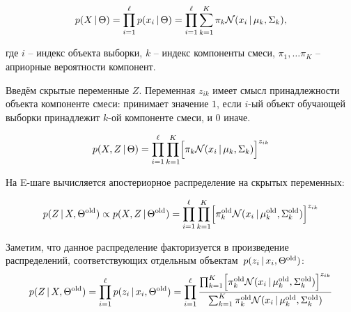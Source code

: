 \documentclass[12pt,a4paper]{article}
\begin{document}
\begin{equation*}
	p(X\mspace{3mu}{|}\mspace{3mu} \Theta) = \prod_{i=1}^\ell p(x_i\mspace{3mu}{|}\mspace{3mu} \Theta) = \prod_{i=1}^\ell \sum_{k=1}^K \pi_k \mathcal{N}(x_i \mspace{3mu}{|}\mspace{3mu} \mu_k, \Sigma_k),
\end{equation*}

где $i$ – индекс объекта выборки, $k$ – индекс компоненты смеси, $\pi_1, \ldots \pi_K$ – априорные вероятности компонент.

Введём скрытые переменные $Z$. Переменная $z_{ik}$ имеет смысл принадлежности объекта компоненте смеси: принимает значение $1$, если $i$-ый объект обучающей выборки принадлежит $k$-ой компоненте смеси, и $0$ иначе.

\begin{equation*}
p(X, Z \mspace{3mu}{|}\mspace{3mu} \Theta) = \prod_{i = 1}^{\ell}\prod_{k = 1}^{K} \Bigl[\pi_k \mathcal{N}(x_i \mspace{3mu}{|}\mspace{3mu} \mu_k, \Sigma_k) \Bigr]^{z_{ik}}
\end{equation*}

На E-шаге вычисляется апостериорное распределение на скрытых переменных:


\begin{equation*}
	p(Z\mspace{3mu}{|}\mspace{3mu} X,\Theta^{\text{old}}) \propto p(X, Z\mspace{3mu}{|}\mspace{3mu} \Theta^{\text{old}}) = \prod_{i = 1}^{\ell}\prod_{k = 1}^{K} \Bigl[\pi_k^{\text{old}} \mathcal{N}(x_i \mspace{3mu}{|}\mspace{3mu} \mu_k^{\text{old}}, \Sigma_k^{\text{old}}) \Bigr]^{z_{ik}}
\end{equation*}


Заметим, что данное распределение факторизуется в произведение распределений, соответствующих отдельным объектам~$p(z_i \mspace{3mu}{|}\mspace{3mu} x_i, \Theta^{\text{old}})$:
\begin{equation*}
p(Z \mspace{3mu}{|}\mspace{3mu} X, \Theta^{\text{old}}) = \prod_{i = 1}^{\ell}p(z_i \mspace{3mu}{|}\mspace{3mu} x_i, \Theta^{\text{old}}) = \prod_{i = 1}^{\ell} \frac{\prod_{k = 1}^{K} \Bigl[\pi_k^{\text{old}} \mathcal{N}(x_i \mspace{3mu}{|}\mspace{3mu} \mu_k^{\text{old}}, \Sigma_k^{\text{old}}) \Bigr]^{z_{ik}}}{\sum_{k=1}^K \pi_k^{\text{old}} \mathcal{N}(x_i \mspace{3mu}{|}\mspace{3mu} \mu_k^{\text{old}}, \Sigma_k^{\text{old}})}
\end{equation*}
\end{document}
